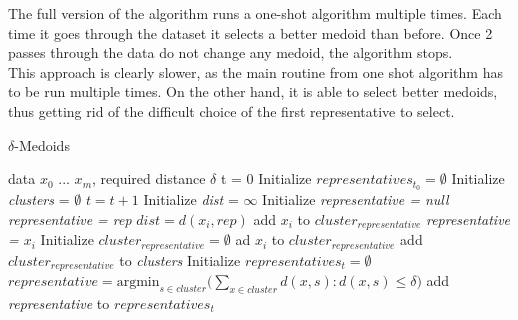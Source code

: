 \documentclass[thesis=B,english]{FITthesis}[2012/10/20]
\begin{document}
The full version of the algorithm runs a one-shot algorithm multiple times.
Each time it goes through the dataset it selects a better medoid than before.
Once 2 passes through the data do not change any medoid, the algorithm stops. \\

This approach is clearly slower, as the main routine from one shot algorithm has to be run multiple times.
On the other hand, it is able to select better medoids, thus getting rid of the difficult choice of the first representative to select.

\begin{algorithm}
    \caption{$\delta$-Medoids}
    \label{delta_medoids_full}
    \begin{algorithmic}[1]
        \INPUT data $x_0$ ... $x_m$, required distance $\delta$
        \STATE t = 0
        \STATE Initialize $representatives_{t_0} = \emptyset$
        \STATE Initialize \textit{clusters} = $\emptyset$
        \DO
            \STATE $t = t + 1$
                \STATE Initialize \textit{dist} = $\infty$
                \STATE Initialize \textit{representative = null}
                        \STATE \textit{representative = rep}
                        \STATE $dist = d(x_i, rep)$
                    \ENDIF
                \ENDFOR
                    \STATE add $x_i$ to $cluster_{representative}$
                \ELSE
                    \STATE \textit{representative = $x_i$}
                    \STATE Initialize $cluster_{representative} = \emptyset$
                    \STATE ad $x_i$ to $cluster_{representative}$
                    \STATE add $cluster_{representative}$ to \textit{clusters}
                \ENDIF
            \ENDFOR
            \STATE Initialize $representatives_t = \emptyset$
                \STATE $representative = \textrm{argmin}_{s \in cluster} (\sum\limits_{x \in cluster}{d(x,s) : d(x,s) \le \delta)}$
                \STATE add \textit{representative} to $representatives_t$
            \ENDFOR
    \end{algorithmic}
\end{algorithm}
\end{document}

